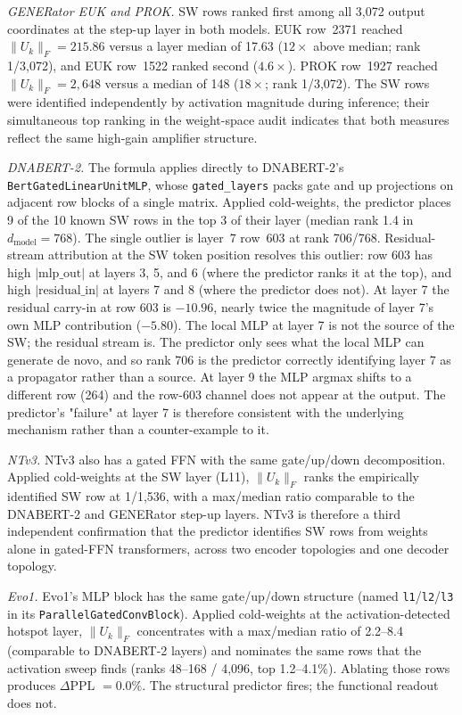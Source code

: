 \documentclass[11pt]{article}
\begin{document}
\textit{GENERator EUK and PROK.}
SW rows ranked first among all 3{,}072 output coordinates at the
step-up layer in both models. EUK row~2371 reached
$\|U_k\|_F = 215.86$ versus a layer median of 17.63 ($12\times$
above median; rank 1/3{,}072), and EUK row~1522 ranked second
($4.6\times$). PROK row~1927 reached $\|U_k\|_F = 2{,}648$ versus a
median of 148 ($18\times$; rank 1/3{,}072). The SW rows were
identified independently by activation magnitude during inference;
their simultaneous top ranking in the weight-space audit indicates
that both measures reflect the same high-gain amplifier structure.

\textit{DNABERT-2.}
The formula applies directly to DNABERT-2's
\texttt{BertGatedLinearUnitMLP}, whose \texttt{gated\_layers} packs
gate and up projections on adjacent row blocks of a single matrix.
Applied cold-weights, the predictor places 9 of the 10 known SW
rows in the top 3 of their layer (median rank 1.4 in
$d_{\text{model}} = 768$). The single outlier is layer~7 row~603 at
rank 706/768. Residual-stream attribution at the SW token position
resolves this outlier: row 603 has high $|\mathrm{mlp\_out}|$ at
layers 3, 5, and 6 (where the predictor ranks it at the top), and
high $|\mathrm{residual\_in}|$ at layers 7 and 8 (where the
predictor does not). At layer 7 the residual carry-in at row 603 is
$-10.96$, nearly twice the magnitude of layer 7's own MLP
contribution ($-5.80$). The local MLP at layer 7 is not the source
of the SW; the residual stream is. The predictor only sees what the
local MLP can generate de novo, and so rank 706 is the predictor
correctly identifying layer 7 as a propagator rather than a source.
At layer 9 the MLP argmax shifts to a different row (264) and the
row-603 channel does not appear at the output. The predictor's
"failure" at layer 7 is therefore consistent with the underlying
mechanism rather than a counter-example to it.

\textit{NTv3.}
NTv3 also has a gated FFN with the same gate/up/down decomposition.
Applied cold-weights at the SW layer (L11), $\|U_k\|_F$ ranks the
empirically identified SW row at 1/1{,}536, with a max/median ratio
comparable to the DNABERT-2 and GENERator step-up layers. NTv3 is
therefore a third independent confirmation that the predictor
identifies SW rows from weights alone in gated-FFN transformers,
across two encoder topologies and one decoder topology.

\textit{Evo1.}
Evo1's MLP block has the same gate/up/down structure (named
\texttt{l1}/\texttt{l2}/\texttt{l3} in its
\texttt{ParallelGatedConvBlock}). Applied cold-weights at the
activation-detected hotspot layer, $\|U_k\|_F$ concentrates with a
max/median ratio of 2.2--8.4 (comparable to DNABERT-2 layers) and
nominates the same rows that the activation sweep finds (ranks
48--168 / 4{,}096, top 1.2--4.1\%). Ablating those rows produces
$\Delta$PPL $= 0.0\%$. The structural predictor fires; the
functional readout does not.
\end{document}
